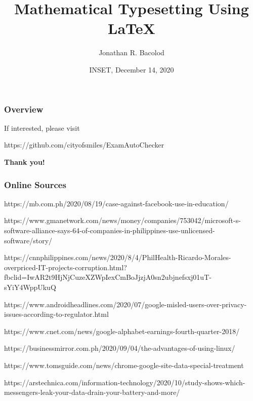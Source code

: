 \documentclass[17pt]{beamer}
\title[Math Typesetting Using \LaTeX] {Mathematical Typesetting Using \LaTeX}
\author{Jonathan R. Bacolod}
\institute[SHS]{Sauyo High School}
\date[INSET, Dec. 2020]{INSET, December 14, 2020}
\begin{document}
	\frame{\titlepage}

	\begin{frame}
		\frametitle{Overview}
		\tableofcontents 
	\end{frame}
	
	
    \begin{frame}
    	\begin{center}
    		If interested, please visit
    		
    		\vspace*{1em}
    		
    		\footnotesize{https://github.com/cityofsmiles/ExamAutoChecker}
    	\end{center}
    \end{frame}

    \begin{frame}
    	\begin{center}
    		\textbf{\LARGE Thank you!}
    	\end{center}
    \end{frame}

	\begin{frame}
		\frametitle{Online Sources}
		\tiny 
		https://mb.com.ph/2020/08/19/case-against-facebook-use-in-education/
\newline
		
		https://www.gmanetwork.com/news/money/companies/753042/microsoft-s-software-alliance-says-64-of-companies-in-philippines-use-unlicensed-software/story/
\newline
		
		https://cnnphilippines.com/news/2020/8/4/PhilHealth-Ricardo-Morales-overpriced-IT-projects-corruption.html?fbclid=IwAR2t9HjNjCuzeXZWpIexCmBoJjzjA0sn2ubjnefsxj01uT-sYiY4WppUkuQ
\newline
		
		https://www.androidheadlines.com/2020/07/google-misled-users-over-privacy-issues-according-to-regulator.html
\newline
		
		https://www.cnet.com/news/google-alphabet-earnings-fourth-quarter-2018/
\newline
		
		https://businessmirror.com.ph/2020/09/04/the-advantages-of-using-linux/
\newline


    https://www.tomsguide.com/news/chrome-google-site-data-special-treatment \newline

    https://arstechnica.com/information-technology/2020/10/study-shows-which-messengers-leak-your-data-drain-your-battery-and-more/
		
	\end{frame}	
	
\end{document}
